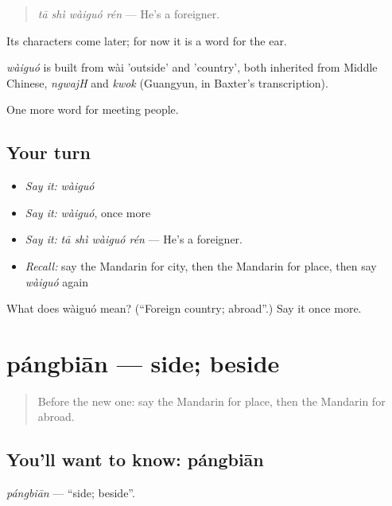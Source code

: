 \begin{quote}
\emph{tā shì wàiguó rén} — He's a foreigner.
\end{quote}

Its characters come later; for now it is a word for the ear.

\begin{cousinweb}
\emph{wàiguó} is built from wài 'outside' and  'country', both inherited from Middle Chinese, \emph{ngwajH} and \emph{kwok} (Guangyun, in Baxter's transcription).
\end{cousinweb}

\begin{grammarlens}[title={What you've built}]
One more word for meeting people.
\end{grammarlens}

\subsection*{Your turn}
\begin{itemize}
\raggedright
  \item \emph{Say it:} \emph{wàiguó}
  \item \emph{Say it:} \emph{wàiguó}, once more
  \item \emph{Say it:} \emph{tā shì wàiguó rén} — He's a foreigner.
  \item \emph{Recall:} say the Mandarin for city, then the Mandarin for place, then say \emph{wàiguó} again
\end{itemize}

\begin{tcolorbox}[breakable,colback=teal!4,colframe=teal!35!black,title={Before you move on}]
What does wàiguó mean? (\textquotedblleft{}Foreign country; abroad\textquotedblright{}.) Say it once more.
\end{tcolorbox}
\section[pángbiān]{pángbiān — side; beside}

\label{lesson:ZH-C81-pangbian}



\begin{quote}
Before the new one: say the Mandarin for place, then the Mandarin for abroad.
\end{quote}

\subsection*{You'll want to know: pángbiān}
\emph{pángbiān} — \textquotedblleft{}side; beside\textquotedblright{}.

